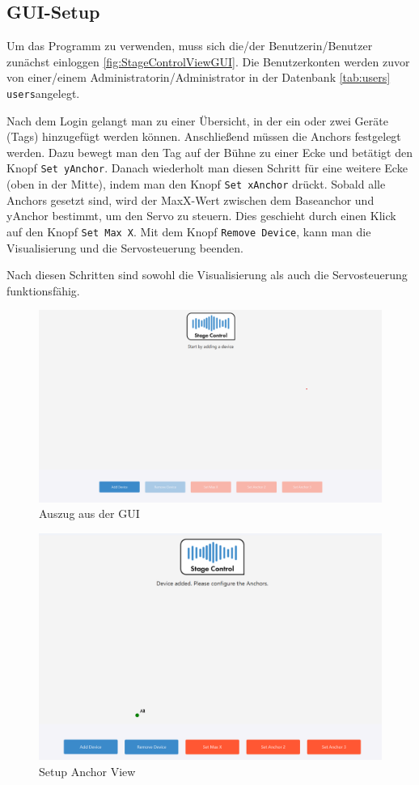 \subsection{GUI-Setup}
Um das Programm zu verwenden, muss sich die/der Benutzerin/Benutzer zunächst einloggen \ref{fig:StageControlViewGUI}. Die Benutzerkonten werden zuvor von einer/einem Administratorin/Administrator in der Datenbank \ref{tab:users} \texttt{users}angelegt.  

Nach dem Login gelangt man zu einer Übersicht, in der ein oder zwei Geräte (Tags) hinzugefügt werden können. Anschließend müssen die Anchors festgelegt werden. Dazu bewegt man den Tag auf der Bühne zu einer Ecke und betätigt den Knopf \texttt{Set yAnchor}. Danach wiederholt man diesen Schritt für eine weitere Ecke (oben in der Mitte), indem man den Knopf \texttt{Set xAnchor} drückt. Sobald alle Anchors gesetzt sind, wird der MaxX-Wert zwischen dem Baseanchor und yAnchor bestimmt, um den Servo zu steuern. Dies geschieht durch einen Klick auf den Knopf \texttt{Set Max X}. Mit dem Knopf \texttt{Remove Device}, kann man die Visualisierung und die Servosteuerung beenden.   

Nach diesen Schritten sind sowohl die Visualisierung als auch die Servosteuerung funktionsfähig.

\begin{figure}[H]
	\centering
	\includegraphics[width=0.9\linewidth]{images/stagecontrol-overview.png}
	\caption[Auszug aus der GUI]{Auszug aus der GUI}
	\label{fig:StageControlOverview}
\end{figure}

\begin{figure}[H]
	\centering
	\includegraphics[width=0.9\linewidth]{images/stagecontrol-setupanchor.png}
	\caption[Setup Anchor View]{Setup Anchor View}
	\label{fig:StageControlSetupAnchor}
\end{figure}

